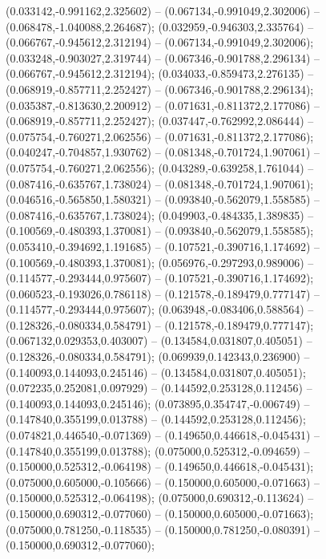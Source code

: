  (0.033142,-0.991162,2.325602) -- (0.067134,-0.991049,2.302006) -- (0.068478,-1.040088,2.264687);
 (0.032959,-0.946303,2.335764) -- (0.066767,-0.945612,2.312194) -- (0.067134,-0.991049,2.302006);
 (0.033248,-0.903027,2.319744) -- (0.067346,-0.901788,2.296134) -- (0.066767,-0.945612,2.312194);
 (0.034033,-0.859473,2.276135) -- (0.068919,-0.857711,2.252427) -- (0.067346,-0.901788,2.296134);
 (0.035387,-0.813630,2.200912) -- (0.071631,-0.811372,2.177086) -- (0.068919,-0.857711,2.252427);
 (0.037447,-0.762992,2.086444) -- (0.075754,-0.760271,2.062556) -- (0.071631,-0.811372,2.177086);
 (0.040247,-0.704857,1.930762) -- (0.081348,-0.701724,1.907061) -- (0.075754,-0.760271,2.062556);
 (0.043289,-0.639258,1.761044) -- (0.087416,-0.635767,1.738024) -- (0.081348,-0.701724,1.907061);
 (0.046516,-0.565850,1.580321) -- (0.093840,-0.562079,1.558585) -- (0.087416,-0.635767,1.738024);
 (0.049903,-0.484335,1.389835) -- (0.100569,-0.480393,1.370081) -- (0.093840,-0.562079,1.558585);
 (0.053410,-0.394692,1.191685) -- (0.107521,-0.390716,1.174692) -- (0.100569,-0.480393,1.370081);
 (0.056976,-0.297293,0.989006) -- (0.114577,-0.293444,0.975607) -- (0.107521,-0.390716,1.174692);
 (0.060523,-0.193026,0.786118) -- (0.121578,-0.189479,0.777147) -- (0.114577,-0.293444,0.975607);
 (0.063948,-0.083406,0.588564) -- (0.128326,-0.080334,0.584791) -- (0.121578,-0.189479,0.777147);
 (0.067132,0.029353,0.403007) -- (0.134584,0.031807,0.405051) -- (0.128326,-0.080334,0.584791);
 (0.069939,0.142343,0.236900) -- (0.140093,0.144093,0.245146) -- (0.134584,0.031807,0.405051);
 (0.072235,0.252081,0.097929) -- (0.144592,0.253128,0.112456) -- (0.140093,0.144093,0.245146);
 (0.073895,0.354747,-0.006749) -- (0.147840,0.355199,0.013788) -- (0.144592,0.253128,0.112456);
 (0.074821,0.446540,-0.071369) -- (0.149650,0.446618,-0.045431) -- (0.147840,0.355199,0.013788);
 (0.075000,0.525312,-0.094659) -- (0.150000,0.525312,-0.064198) -- (0.149650,0.446618,-0.045431);
 (0.075000,0.605000,-0.105666) -- (0.150000,0.605000,-0.071663) -- (0.150000,0.525312,-0.064198);
 (0.075000,0.690312,-0.113624) -- (0.150000,0.690312,-0.077060) -- (0.150000,0.605000,-0.071663);
 (0.075000,0.781250,-0.118535) -- (0.150000,0.781250,-0.080391) -- (0.150000,0.690312,-0.077060);

